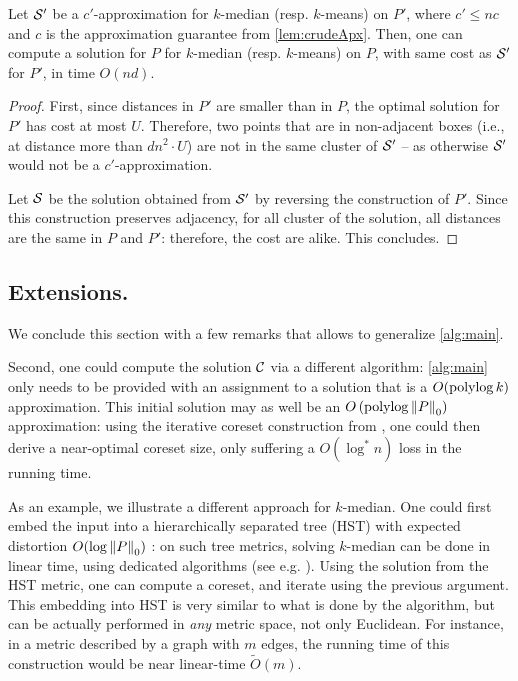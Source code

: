 \begin{lemma}
Let $\mathcal S'$ be a $c'$-approximation for  $k$-median (resp. $k$-means) on $P'$, where $c' \leq nc$ and $c$ is the approximation guarantee from \cref{lem:crudeApx}. Then, one can compute a solution for $P$ for $k$-median (resp. $k$-means) on $P$, with same cost as $\mathcal S'$ for $P'$, in time $O(nd)$.
\end{lemma}
\begin{proof}
First, since distances in $P'$ are smaller than in $P$, the optimal solution for $P'$ has cost at most $U$. Therefore, two points that are in non-adjacent boxes (i.e., at distance more than $d n^2\cdot U$) are not in the same cluster of $\mathcal S'$ -- as otherwise $\mathcal S'$ would not be a $c'$-approximation.

Let $\mathcal S$ be the solution obtained from $\mathcal S'$ by reversing the construction of $P'$. Since this construction preserves adjacency, for all cluster of the solution, all distances are the same in $P$ and $P'$: therefore, the cost are alike. This concludes.
\end{proof}


\subsection*{Extensions.} 
We conclude this section with a few remarks that allows to generalize \cref{alg:main}.

Second, one could compute the solution $\mathcal C$ via a different algorithm: \cref{alg:main} only needs to be provided with an assignment to a solution that is a $O(\operatorname{polylog} k)$ approximation. 
This initial solution may as well be an $O\left(\operatorname{polylog} \left\| P \right\|_0 \right)$ approximation: using the iterative coreset construction from \cite{BravermanJKW21}, one could then derive a near-optimal coreset size, only suffering a $O(\log^* n)$ loss in the running time.

As an example, we illustrate a different approach for $k$-median. One could first embed the input into a hierarchically separated tree (HST) with expected distortion $O(\log \left\| P \right\|_0)$ \cite{FakcharoenpholRT03}: on such tree metrics, solving $k$-median can be done in linear time, using dedicated algorithms (see e.g. \cite{Cohen-AddadLNSS21}). Using the solution from the HST metric, one can compute a coreset, and iterate using the previous argument.
This embedding into HST is very similar to what is done by the \fkmeans algorithm, but can be actually performed in \emph{any} metric space, not only Euclidean. 
For instance, in a metric described by a graph with $m$ edges, the running time of this construction would be near linear-time $\tilde O(m)$. %

